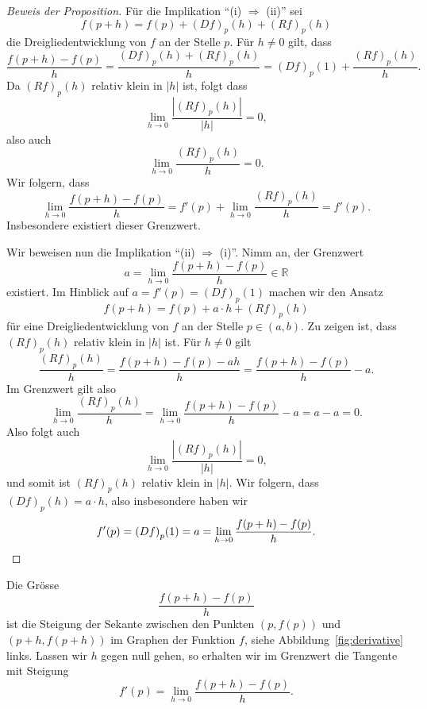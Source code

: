 \documentclass[../main.tex]{subfiles}
\begin{document}
\begin{proof}[Beweis der Proposition]
  Für die Implikation ``(i) $\Rightarrow$ (ii)''
  sei
  \[
    f(p + h) = f(p) + {(Df)}_p(h) + {(Rf)}_p(h)
  \]
  die Dreigliedentwicklung von $f$ an der
  Stelle $p$.
  Für $h \neq 0$ gilt, dass
  \[
    \frac{f(p + h) - f(p)}{h}
    = \frac{{(Df)}_p(h) + {(Rf)}_p(h)}{h}
    ={(Df)}_p(1) + \frac{{(Rf)}_p(h)}{h}.
  \]
  Da ${(Rf)}_p(h)$ relativ klein in $|h|$ ist,
  folgt dass
  \[
    \lim_{h \to 0} \frac{|{(Rf)}_p(h)|}{|h|} = 0,
  \]
  also auch
  \[
    \lim_{h \to 0} \frac{{(Rf)}_p(h)}{h} = 0.
  \]
  Wir folgern, dass
  \[
    \lim_{h \to 0} \frac{f(p + h) - f(p)}{h}
    = f'(p) + \lim_{h \to 0} \frac{{(Rf)}_p(h)}{h} = f'(p).
  \]
  Insbesondere existiert dieser Grenzwert.

  Wir beweisen nun die Implikation
  ``(ii) $\Rightarrow$ (i)''.
  Nimm an, der Grenzwert
  \[
    a = \lim_{h \to 0} \frac{f(p+h) - f(p)}{h} \in \mathbb{R}
  \]
  existiert.
  Im Hinblick auf $a = f'(p) = {(Df)}_p(1)$
  machen wir den Ansatz
  \[
    f(p + h) = f(p) + a \cdot h + {(Rf)}_p(h)
  \]
  für eine Dreigliedentwicklung von $f$ an der Stelle
  $p \in (a, b)$. Zu zeigen ist, dass
  ${(Rf)}_p(h)$ relativ klein in $|h|$ ist.
  Für $h \neq 0$ gilt
  \[
    \frac{{(Rf)}_p(h)}{h} =
    \frac{f(p+h) - f(p) - ah}{h}
    = \frac{f(p+h) - f(p)}{h} - a.
  \]
  Im Grenzwert gilt also
  \[
    \lim_{h \to 0} \frac{{(Rf)}_p(h)}{h}
    = \lim_{h \to 0}
    \frac{f(p + h) - f(p)}{h} - a
    = a - a = 0.
  \]
  Also folgt auch
  \[
    \lim_{h \to 0} \frac{|{(Rf)}_p(h)|}{|h|} = 0,
  \]
  und somit ist ${(Rf)}_p(h)$ relativ klein
  in $|h|$.
  Wir folgern, dass ${(Df)}_p(h) = a \cdot h$,
  also insbesondere haben wir
  \[
    f'(p) = {(Df)}_p(1) = a = 
    \lim_{h \to 0} \frac{f(p + h) - f(p)}{h}. \qedhere
  \]
\end{proof}

\begin{geometric}
  Die Grösse
  \[
    \frac{f(p+h) - f(p)}{h}
  \]
  ist die Steigung der Sekante
  zwischen den Punkten $(p, f(p))$ 
  und $(p + h, f(p+h))$ im Graphen
  der Funktion $f$, siehe Abbildung~\ref{fig:derivative}
  links.
  Lassen wir $h$ gegen null gehen,
  so erhalten wir im Grenzwert die Tangente
  mit Steigung
  \[
    f'(p) = \lim_{h \to 0} \frac{f(p + h) - f(p)}{h}.
  \]
\end{geometric}
\end{document}
